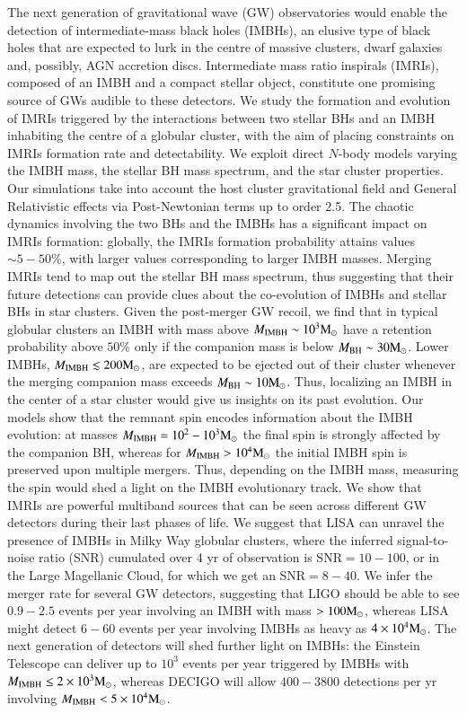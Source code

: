 \documentclass[article]{aa}
\newcommand{\Ms}{{\rm M}_\odot}
\newcommand{\ibh}{{\rm IMBH}}
\newcommand{\bh}{{\rm BH}}
\begin{document}
\abstract 
{The next generation of gravitational wave (GW) observatories would enable the detection of intermediate-mass black holes (IMBHs), an elusive type of black holes that are expected to lurk in the centre of massive clusters, dwarf galaxies and, possibly, AGN accretion discs. Intermediate mass ratio inspirals (IMRIs), composed of an IMBH and a compact stellar object, constitute one promising source of GWs audible to these detectors.} 
{We study the formation and evolution of IMRIs triggered by the interactions between two stellar BHs and an IMBH inhabiting the centre of a globular cluster, with the aim of placing constraints on IMRIs formation rate and detectability.}
{We exploit direct $N$-body models varying the IMBH mass, the stellar BH mass spectrum, and the star cluster properties. Our simulations take into account the host cluster gravitational field and General Relativistic effects via Post-Newtonian terms up to order 2.5.} 
{The chaotic dynamics involving the two BHs and the IMBHs has a significant impact on IMRIs formation: globally, the IMRIs formation probability attains values $\sim 5-50\%$, with larger values corresponding to larger IMBH masses. Merging IMRIs tend to map out the stellar BH mass spectrum, thus suggesting that their future detections can provide clues about the co-evolution of IMBHs and stellar BHs in star clusters. Given the post-merger GW recoil, we find that in typical globular clusters an IMBH with mass above $M_\ibh\sim 10^3\Ms$ have a retention probability above $50\%$ only if the companion mass is below $M_\bh\sim30\Ms$. Lower IMBHs, $M_\ibh \lesssim 200\Ms$, are expected to be ejected out of their cluster whenever the merging companion mass exceeds $M_\bh\sim 10\Ms$. Thus, localizing an IMBH in the center of a star cluster would give us insights on its past evolution. Our models show that the remnant spin encodes information about the IMBH evolution: at masses $M_\ibh = 10^2-10^3\Ms$ the final spin is strongly affected by the companion BH, whereas for $M_\ibh > 10^4\Ms$ the initial IMBH spin is preserved upon multiple mergers. Thus, depending on the IMBH mass, measuring the spin would shed a light on the IMBH evolutionary track. We show that IMRIs are powerful multiband sources that can be seen across different GW detectors during their last phases of life. We suggest that LISA can unravel the presence of IMBHs in Milky Way globular clusters, where the inferred signal-to-noise ratio (SNR) cumulated over 4 yr of observation is SNR$=10-100$, or in the Large Magellanic Cloud, for which we get an SNR$=8-40$. We infer the merger rate for several GW detectors, suggesting that LIGO should be able to see $0.9-2.5$ events per year involving an IMBH with mass $>100\Ms$, whereas LISA might detect $6-60$ events per year involving IMBHs as heavy as $4\times 10^4\Ms$. The next generation of detectors will shed further light on IMBHs: the Einstein Telescope can deliver up to $10^3$ events per year triggered by IMBHs with $M_\ibh \leq 2\times 10^3\Ms$, whereas DECIGO will allow $400-3800$ detections per yr involving $M_\ibh < 5\times 10^4\Ms$.}
\end{document}
